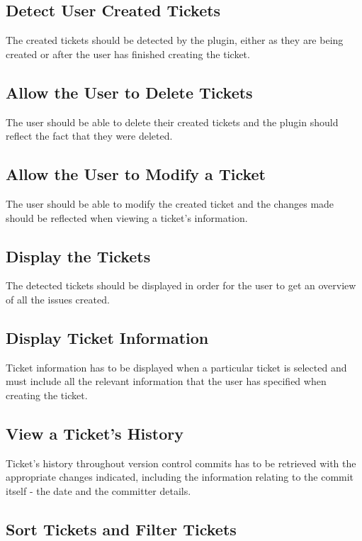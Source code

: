 \documentclass{4thYearProject}
\begin{document}
\subsection{Detect User Created Tickets}

The created tickets should be detected by the plugin, either as they are being created or after the user has finished creating the ticket. 

\subsection{Allow the User to Delete Tickets}

The user should be able to delete their created tickets and the plugin should reflect the fact that they were deleted. 

\subsection{Allow the User to Modify a Ticket}

The user should be able to modify the created ticket and the changes made should be reflected when viewing a ticket's information.

\subsection{Display the Tickets}

The detected tickets should be displayed in order for the user to get an overview of all the issues created.

\subsection{Display Ticket Information}

Ticket information has to be displayed when a particular ticket is selected and must include all the relevant information that the user has specified when creating the ticket.

\subsection{View a Ticket's History}

Ticket's history throughout version control commits has to be retrieved with the appropriate changes indicated, including the information relating to the commit itself - the date and the committer details.

\subsection{Sort Tickets and Filter Tickets}
\end{document}
